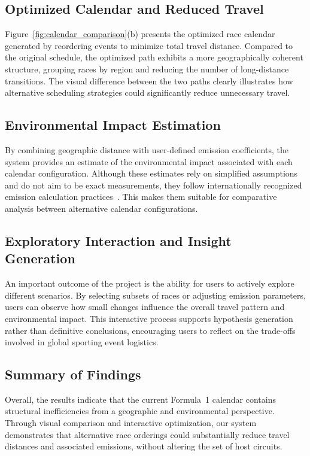 \documentclass{egpubl}
\begin{document}
\subsection{Optimized Calendar and Reduced Travel}
Figure~\ref{fig:calendar_comparison}(b) presents the optimized race calendar generated by reordering events to minimize total travel distance. Compared to the original schedule, the optimized path exhibits a more geographically coherent structure, grouping races by region and reducing the number of long-distance transitions. The visual difference between the two paths clearly illustrates how alternative scheduling strategies could significantly reduce unnecessary travel.

\subsection{Environmental Impact Estimation}
By combining geographic distance with user-defined emission coefficients, the system provides an estimate of the environmental impact associated with each calendar configuration. Although these estimates rely on simplified assumptions and do not aim to be exact measurements, they follow internationally recognized emission calculation practices~\cite{FuelBurnCommercialJets,ICAOCalculatorAirFreight}. This makes them suitable for comparative analysis between alternative calendar configurations.


\subsection{Exploratory Interaction and Insight Generation}
An important outcome of the project is the ability for users to actively explore different scenarios. By selecting subsets of races or adjusting emission parameters, users can observe how small changes influence the overall travel pattern and environmental impact. This interactive process supports hypothesis generation rather than definitive conclusions, encouraging users to reflect on the trade-offs involved in global sporting event logistics.

\subsection{Summary of Findings}
Overall, the results indicate that the current Formula~1 calendar contains structural inefficiencies from a geographic and environmental perspective. Through visual comparison and interactive optimization, our system demonstrates that alternative race orderings could substantially reduce travel distances and associated emissions, without altering the set of host circuits.
\end{document}
